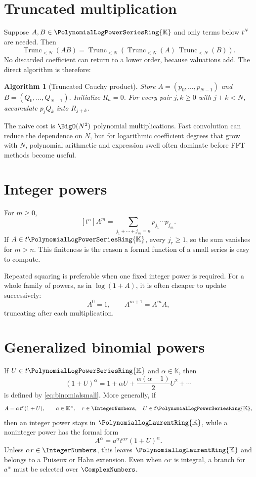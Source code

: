 \documentclass[11pt,oneside,openany]{book}
\newtheorem{algorithm}[theorem]{Algorithm}
\newcommand{\K}{\mathbb{K}}
\newcommand{\Rring}{\PolynomialLogPowerSeriesRing{\K}}
\newcommand{\Pring}{\PolynomialLogLaurentRing{\K}}
\newcommand{\TransseriesTruncateBelow}[2]{%
  \operatorname{Trunc}_{<#2}\!\left(#1\right)%
}
\begin{document}
\section{Truncated multiplication}
Suppose \(A,B\in\Rring\) and only terms below \(t^N\) are needed.  Then
\begin{equation}\label{eq:truncmult}
 \TransseriesTruncateBelow{AB}{N}
 =\TransseriesTruncateBelow{%
    \TransseriesTruncateBelow{A}{N}\,
    \TransseriesTruncateBelow{B}{N}%
  }{N}.
\end{equation}
No discarded coefficient can return to a lower order, because valuations add.
The direct algorithm is therefore:

\begin{algorithm}[Truncated Cauchy product]\label{alg:mul}
Store \(A=(p_0,\ldots,p_{N-1})\) and
\(B=(Q_0,\ldots,Q_{N-1})\).  Initialize \(R_n=0\).  For every pair
\(j,k\geq0\) with \(j+k<N\), accumulate \(p_jQ_k\) into \(R_{j+k}\).
\end{algorithm}

The naive cost is \(\BigO(N^2)\) polynomial multiplications.  Fast convolution
can reduce the dependence on \(N\), but for logarithmic coefficient degrees
that grow with \(N\), polynomial arithmetic and expression swell often dominate
before FFT methods become useful.

\section{Integer powers}
For \(m\geq0\),
\begin{equation}\label{eq:powercoefficient}
 [t^n]A^m
 =\sum_{j_1+\cdots+j_m=n}
   p_{j_1}\cdots p_{j_m}.
\end{equation}
If \(A\in t\Rring\), every \(j_r\geq1\), so the sum vanishes for \(m>n\).
This finiteness is the reason a formal function of a small series is easy to
compute.

Repeated squaring is preferable when one fixed integer power is required.
For a whole family of powers, as in \(\log(1+A)\), it is often cheaper to update
successively:
\[
 A^0=1,
 \qquad
 A^{m+1}=A^mA,
\]
truncating after each multiplication.

\section{Generalized binomial powers}
If \(U\in t\Rring\) and \(\alpha\in\K\), then
\[
 (1+U)^\alpha
 =1+\alpha U+\frac{\alpha(\alpha-1)}{2}U^2+\cdots
\]
is defined by \cref{eq:binomialsmall}.  More generally, if
\[
 A=a\,t^r(1+U),
 \qquad a\in\K^\times,
 \quad r\in\IntegerNumbers,
 \quad U\in t\Rring,
\]
then an integer power stays in \(\Pring\), while a noninteger power has the
formal form
\begin{equation}\label{eq:genpower}
 A^\alpha=a^\alpha t^{\alpha r}(1+U)^\alpha.
\end{equation}
Unless \(\alpha r\in\IntegerNumbers\), this leaves \(\Pring\) and belongs to a
Puiseux or Hahn extension.  Even when \(\alpha r\) is integral, a branch for
\(a^\alpha\) must be selected over \(\ComplexNumbers\).
\end{document}
